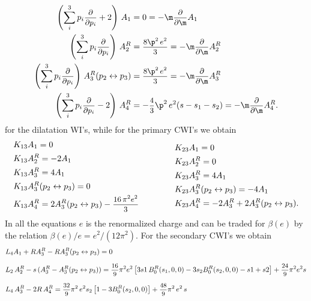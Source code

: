 \documentclass[a4paper,11pt,openright,twoside]{book}
\newcommand{\sdfrac}[2]{\mbox{\small$\displaystyle\frac{#1}{#2}$}}
\numberwithin{equation}{section}
\begin{document}
{{\begin{align}
	\left(\sum_{i}^{3}p_i\sdfrac{\partial}{\partial p_i}+2\right)\,A_1&=0=-\m\sdfrac{\partial}{\partial \m}A_1\\
	\left(\sum_{i}^{3}p_i\sdfrac{\partial}{\partial p_i}\right)\,A_2^R&=\sdfrac{8\p^2\,e^2}{3}=-\m\sdfrac{\partial}{\partial \m}A_2^R\\
	\left(\sum_{i}^{3}p_i\sdfrac{\partial}{\partial p_i}\right)\,A_3^R(p_2\leftrightarrow p_3)&=\sdfrac{8\p^2\,e^2}{3}=-\m\sdfrac{\partial}{\partial \m}A_3^R\\
	\left(\sum_{i}^{3}p_i\sdfrac{\partial}{\partial p_i}-2\right)\,A_4^R&=-\sdfrac{4}{3}\p^2\,e^2(s-s_1-s_2)=-\m\sdfrac{\partial}{\partial \m}A_4^R.
\end{align}
for the dilatation WI's, while for the primary CWI's we obtain
\begin{equation}
	\begin{split}
		&K_{13}A_1=0\\
		&K_{13}A^R_2=-2A_1\\
		&K_{13}A^R_3=4A_1\\
		&K_{13}A^R_3(p_2\leftrightarrow p_3)=0\\
		&K_{13}A^R_4=2A^R_3(p_2\leftrightarrow p_3)-\sdfrac{16\,\pi^2e^2}{3}
	\end{split}
	\hspace{1.5cm}
	\begin{split}
		&K_{23}A_1=0\\
		&K_{23}A^R_2=0\\
		&K_{23}A^R_3=4A_1\\
		&K_{23}A^R_3(p_2\leftrightarrow p_3)=-4A_1\\
		&K_{23}A^R_4=-2A^R_3+2A^R_3(p_2\leftrightarrow p_3).
	\end{split}
\end{equation}
In all the equations $e$ is the renormalized charge and can be traded for $\beta(e)$ by the relation $\beta(e)/e=e^2/(12 \pi^2)$. 
For the secondary CWI's we obtain
\begin{equation}
	\begin{split}
		&L_4 A_1+R A_3^R-R A_3^R(p_2\leftrightarrow p_3)=0\\[1.5ex]
		&L_2\,A_2^R-s\,(A_3^R-A_3^R(p_2\leftrightarrow p_3))=\sdfrac{16}{9}\pi^2e^2\left[3s1\,B_0^R(s_1,0,0)-3s_2B_0^R(s_2,0,0)-s1+s2\right]+\sdfrac{24}{9}\pi^2e^2s\\[1.5ex]
		&L_4\,A^R_3-2R\,A^R_4=\sdfrac{32}{9}\pi^2\,e^2s_2\left[1-3B_0^R(s_2,0,0)\right]+\sdfrac{48}{9}\pi^2\,e^2\,s\\[1.5ex]

\end{split}
\end{equation}}}
\end{document}

